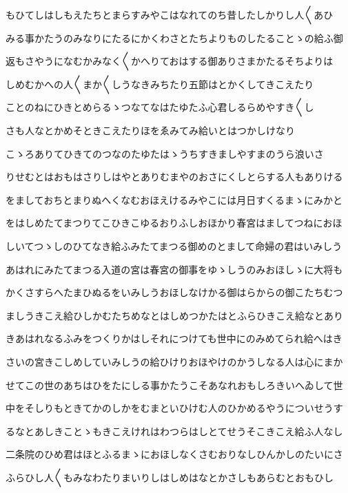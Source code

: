 \documentclass[a4paper,11pt,landscape]{ltjtarticle}
\begin{document}
\par\medskip
もひてしはしもえたちとまらすみやこはなれてのち昔したしかりし人〱あひ
\par\medskip
みる事かたうのみなりにたるにかくわさとたちよりものしたることゝの給ふ御
\par\medskip
返もさやうになむかみなく〱かへりておはする御ありさまかたるそちよりは
\par\medskip
しめむかへの人〱まか〱しうなきみちたり五節はとかくしてきこえたり
\par\medskip
ことのねにひきとめらるゝつなてなはたゆたふ心君しるらめやすき〱し
\par\medskip
さも人なとかめそときこえたりほをゑみてみ給いとはつかしけなり
\par\medskip
こゝろありてひきてのつなのたゆたはゝうちすきましやすまのうら浪いさ
\par\medskip
りせむとはおもはさりしはやとありむまやのおさにくしとらする人もありける
\par\medskip
をましておちとまりぬへくなむおほえけるみやこには月日すくるまゝにみかと
\par\medskip
をはしめたてまつりてこひきこゆるおりふしおほかり春宮はましてつねにおほ
\par\medskip
しいてつゝしのひてなき給ふみたてまつる御めのとまして命婦の君はいみしう
\par\medskip
あはれにみたてまつる入道の宮は春宮の御事をゆゝしうのみおほしゝに大将も
\par\medskip
かくさすらへたまひぬるをいみしうおほしなけかる御はらからの御こたちむつ
\par\medskip
ましうきこえ給ひしかむたちめなとはしめつかたはとふらひきこえ給なとあり
\par\medskip
きあはれなるふみをつくりかはしそれにつけても世中にのみめてられ給へはき
\par\medskip
さいの宮きこしめしていみしうの給ひけりおほやけのかうしなる人は心にまか
\par\medskip
せてこの世のあちはひをたにしる事かたうこそあなれおもしろきいへゐして世
\par\medskip
中をそしりもときてかのしかをむまといひけむ人のひかめるやうについせうす
\par\medskip
るなとあしきことゝもきこえけれはわつらはしとてせうそこきこえ給ふ人なし
\par\medskip
二条院のひめ君はほとふるまゝにおほしなくさむおりなしひんかしのたいにさ
\par\medskip
ふらひし人〱もみなわたりまいりしはしめはなとかさしもあらむとおもひし
\par\medskip
\end{document}
